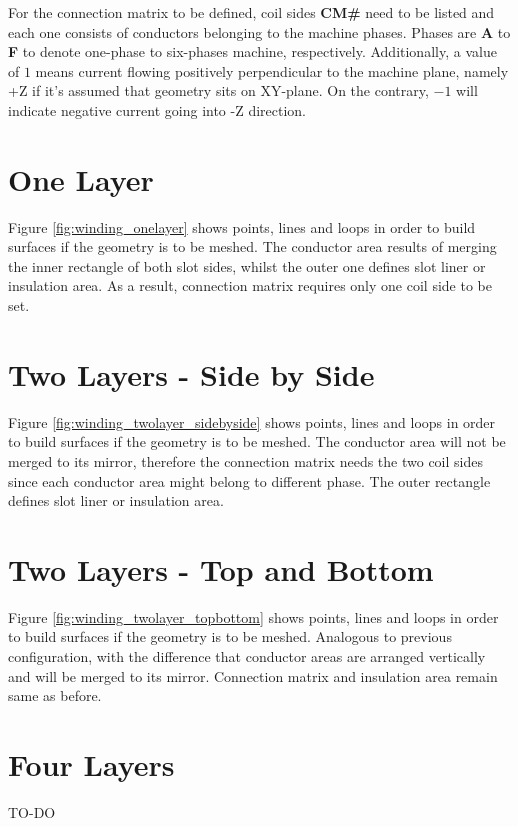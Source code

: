 \documentclass[justified]{tufte-book} %
\begin{document}
For the connection matrix to be defined, coil sides \textbf{CM\#} need to be listed and each one consists of conductors belonging to the machine phases. Phases are \textbf{A} to  \textbf{F} to denote one-phase to six-phases machine, respectively. Additionally, a value of $1$ means current flowing positively perpendicular to the machine plane, namely +Z if it's assumed that geometry sits on XY-plane. On the contrary, $-1$ will indicate negative current going into -Z direction.   
 
\section[One Layer]{One Layer}
Figure \ref{fig:winding_onelayer} shows points, lines and loops in order to build surfaces if the geometry is to be meshed. The conductor area results of merging the inner rectangle of both slot sides, whilst the outer one defines slot liner or insulation area. As a result, connection matrix requires only one coil side to be set.

\section[Two Layers - Side by Side]{Two Layers - Side by Side}
Figure \ref{fig:winding_twolayer_sidebyside} shows points, lines and loops in order to build surfaces if the geometry is to be meshed. The conductor area will not be merged to its mirror, therefore the connection matrix needs the two coil sides since each conductor area might belong to different phase. The outer rectangle defines slot liner or insulation area.

\section[Two Layers - Top and Bottom]{Two Layers - Top and Bottom}
Figure \ref{fig:winding_twolayer_topbottom} shows points, lines and loops in order to build surfaces if the geometry is to be meshed. Analogous to previous configuration, with the difference that conductor areas are arranged vertically and will be merged to its mirror. Connection matrix and insulation area remain same as before.

\section[Four Layers]{Four Layers}
TO-DO
\end{document}
